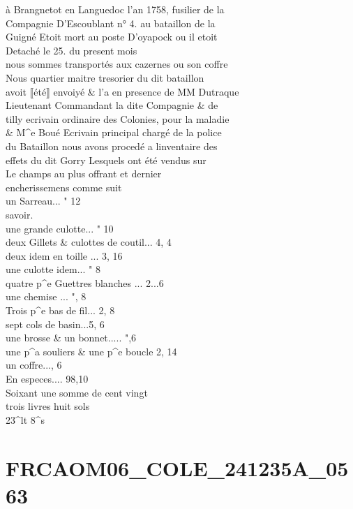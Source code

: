 \documentclass{article}
\begin{document}
\begin{pages}
à Brangnetot en Languedoc l'an 1758, fusilier de la\\
Compagnie D'Escoublant n° 4. au bataillon de la\\
Guigné Etoit mort au poste D'oyapock ou il etoit\\
Detaché le 25. du present mois\\
nous sommes transportés aux cazernes ou son coffre\\
Nous quartier maitre tresorier du dit bataillon\\
avoit ⟦été⟧ envoiyé \& l'a en presence de MM Dutraque\\
Lieutenant Commandant la dite Compagnie \& de\\
tilly ecrivain ordinaire des Colonies, pour la maladie\\
\& M\^{}e Boué Ecrivain principal chargé de la police\\
du Bataillon nous avons procedé a linventaire des\\
effets du dit Gorry Lesquels ont été vendus sur\\
Le champs au plus offrant et dernier\\
encherissemens comme suit\\
un Sarreau... " 12\\
savoir.\\
une grande culotte... " 10\\
deux Gillets \& culottes de coutil... 4, 4\\
deux idem en toille ... 3, 16\\
une culotte idem... " 8\\
quatre p\^{}e Guettres blanches ... 2...6\\
une chemise ... ", 8\\
Trois p\^{}e bas de fil... 2, 8\\
sept cols de basin...5, 6\\
une brosse \& un bonnet..... ",6\\
une  p\^{}a souliers \& une p\^{}e boucle 2, 14\\
un coffre..., 6\\
En especes.... 98,10\\
Soixant une somme de cent vingt\\
trois livres huit sols\\
23\^{}lt 8\^{}s
\pend
\endnumbering\beginnumbering\section{FRCAOM06\_COLE\_241235A\_0563}\pstart

\end{pages}
\end{document}
